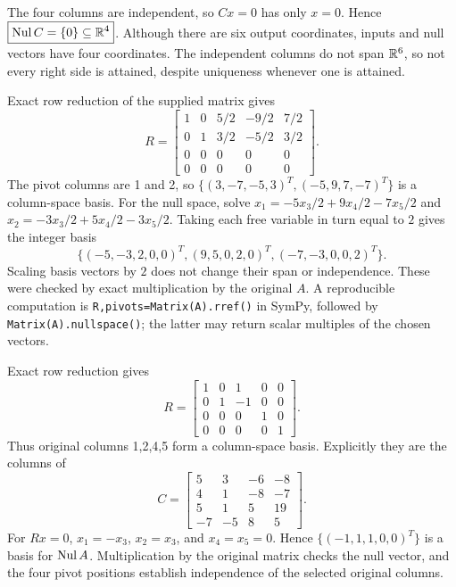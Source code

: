 The four columns are independent, so $Cx=0$ has only $x=0$.
Hence $\boxed{\operatorname{Nul} C=\{0\}\subseteq\mathbb{R}^4}$.
Although there are six output coordinates, inputs and null vectors have
four coordinates. The independent columns do not span $\mathbb{R}^6$, so not
every right side is attained, despite uniqueness whenever one is attained.

Exact row reduction of the supplied matrix gives
\[
 R=\begin{bmatrix}
 1&0&5/2&-9/2&7/2\\0&1&3/2&-5/2&3/2\\
 0&0&0&0&0\\0&0&0&0&0
 \end{bmatrix}.
\]
The pivot columns are 1 and 2, so
$\{(3,-7,-5,3)^T,(-5,9,7,-7)^T\}$ is a column-space basis.
For the null space, solve
$x_1=-5x_3/2+9x_4/2-7x_5/2$ and
$x_2=-3x_3/2+5x_4/2-3x_5/2$.
Taking each free variable in turn equal to $2$ gives the integer basis
\[
 \{(-5,-3,2,0,0)^T,(9,5,0,2,0)^T,(-7,-3,0,0,2)^T\}.
\]
Scaling basis vectors by $2$ does not change their span or independence.
These were checked by exact multiplication by the original $A$.
A reproducible computation is \texttt{R,pivots=Matrix(A).rref()}
in SymPy, followed by \texttt{Matrix(A).nullspace()}; the latter may
return scalar multiples of the chosen vectors.

Exact row reduction gives
\[
 R=\begin{bmatrix}1&0&1&0&0\\0&1&-1&0&0\\0&0&0&1&0\\0&0&0&0&1\end{bmatrix}.
\]
Thus original columns 1,2,4,5 form a column-space basis. Explicitly they
are the columns of
\[
 C=\begin{bmatrix}5&3&-6&-8\\4&1&-8&-7\\5&1&5&19\\-7&-5&8&5\end{bmatrix}.
\]
For $Rx=0$, $x_1=-x_3$, $x_2=x_3$, and $x_4=x_5=0$.
Hence $\{(-1,1,1,0,0)^T\}$ is a basis for $\operatorname{Nul} A$.
Multiplication by the original matrix checks the null vector, and the
four pivot positions establish independence of the selected original columns.
